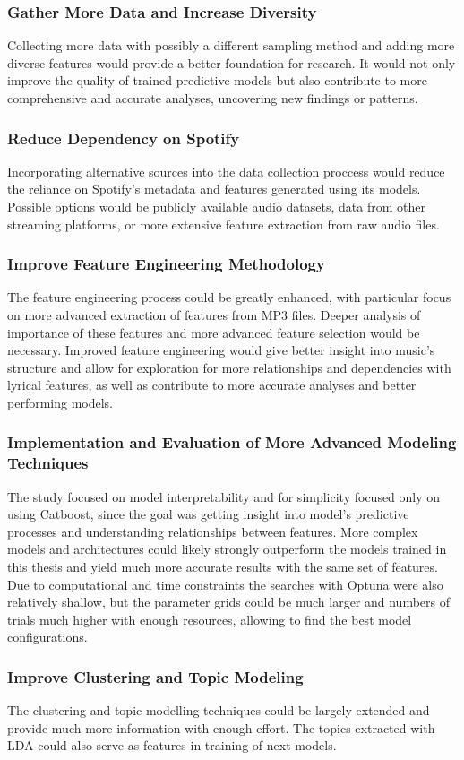 \subsubsection*{Gather More Data and Increase Diversity}
Collecting more data with possibly a different sampling method and adding
more diverse features would provide a better foundation for research. It would
not only improve the quality of trained predictive models but also contribute
to more comprehensive and accurate analyses, uncovering new findings or patterns.

\subsubsection*{Reduce Dependency on Spotify}
Incorporating alternative sources into the data collection proccess would reduce
the reliance on Spotify's metadata and features generated using its models.
Possible options would be publicly available audio datasets, data from other
streaming platforms, or more extensive feature extraction from raw audio files.


\subsubsection*{Improve Feature Engineering Methodology}
The feature  engineering process could be greatly enhanced, with particular
focus on more advanced extraction of features from MP3 files. Deeper analysis
of importance of these features and more advanced feature selection would be
necessary. Improved feature engineering would give better insight into music's
structure and allow for exploration for more relationships and dependencies
with lyrical features, as well as contribute to more accurate analyses and
better performing models.

\subsubsection*{Implementation and Evaluation of More Advanced Modeling Techniques}
The study focused on model interpretability and for simplicity focused only on
using Catboost, since the goal was getting insight into model's predictive
processes and understanding relationships between features. More complex models
and architectures could likely strongly outperform the models trained in this
thesis and yield much more accurate results with the same set of features. Due
to computational and time constraints the searches with Optuna were also
relatively shallow, but the parameter grids could be much larger and numbers of
trials much higher with enough resources, allowing to find the best model
configurations.

\subsubsection*{Improve Clustering and Topic Modeling}
The clustering and topic modelling techniques could be largely extended and
provide much more information with enough effort. The topics extracted with LDA
could also serve as features in training of next models.
